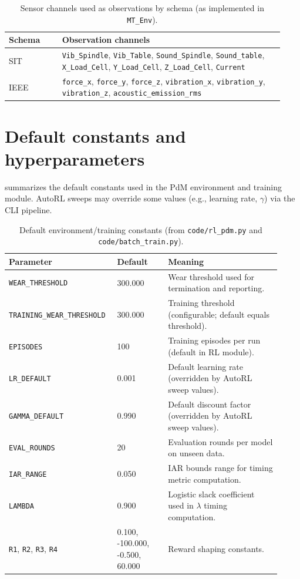\documentclass[11pt]{article}
\begin{document}
\begin{table}[t]
\centering
\caption{Sensor channels used as observations by schema (as implemented in \texttt{MT\_Env}).}
\label{tab:schema_features}
\begin{tabular}{p{0.18\linewidth} p{0.75\linewidth}}
\toprule
\rowcolor{gray!20} \textbf{Schema} & \textbf{Observation channels}\\
\midrule
SIT & \texttt{Vib\_Spindle}, \texttt{Vib\_Table}, \texttt{Sound\_Spindle}, \texttt{Sound\_table}, \texttt{X\_Load\_Cell}, \texttt{Y\_Load\_Cell}, \texttt{Z\_Load\_Cell}, \texttt{Current}\\
IEEE & \texttt{force\_x}, \texttt{force\_y}, \texttt{force\_z}, \texttt{vibration\_x}, \texttt{vibration\_y}, \texttt{vibration\_z}, \texttt{acoustic\_emission\_rms}\\
\bottomrule
\end{tabular}
\end{table}

\section{Default constants and hyperparameters}
\label{app:defaults}
 summarizes the default constants used in the PdM environment and training module. AutoRL sweeps may override some values (e.g., learning rate, $\gamma$) via the CLI pipeline.

\begin{table}[t]
\centering
\caption{Default environment/training constants (from \texttt{code/rl\_pdm.py} and \texttt{code/batch\_train.py}).}
\label{tab:defaults}
\begin{tabular}{p{0.34\linewidth} p{0.18\linewidth} p{0.40\linewidth}}
\toprule
\rowcolor{gray!20} \textbf{Parameter} & \textbf{Default} & \textbf{Meaning}\\
\midrule
\texttt{WEAR\_THRESHOLD} & 300.000 & Wear threshold used for termination and reporting.\\
\texttt{TRAINING\_WEAR\_THRESHOLD} & 300.000 & Training threshold (configurable; default equals threshold).\\
\texttt{EPISODES} & 100 & Training episodes per run (default in RL module).\\
\texttt{LR\_DEFAULT} & 0.001 & Default learning rate (overridden by AutoRL sweep values).\\
\texttt{GAMMA\_DEFAULT} & 0.990 & Default discount factor (overridden by AutoRL sweep values).\\
\texttt{EVAL\_ROUNDS} & 20 & Evaluation rounds per model on unseen data.\\
\texttt{IAR\_RANGE} & 0.050 & IAR bounds range for timing metric computation.\\
\texttt{LAMBDA} & 0.900 & Logistic slack coefficient used in $\lambda$ timing computation.\\
\texttt{R1}, \texttt{R2}, \texttt{R3}, \texttt{R4} & 0.100, -100.000, -0.500, 60.000 & Reward shaping constants.\\
\bottomrule
\end{tabular}
\end{table}

\printbibliography[title={References}]
\end{document}

